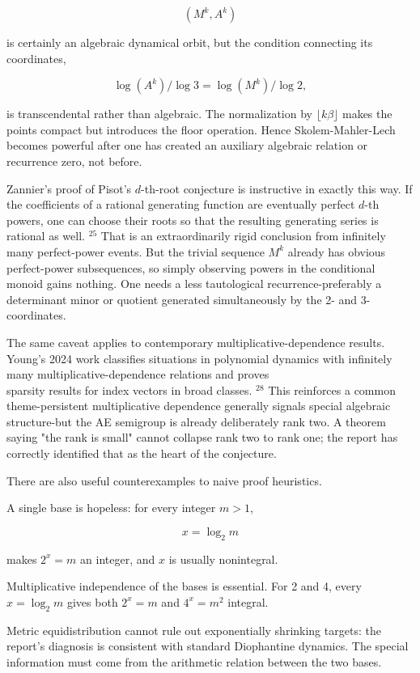 \documentclass[10pt]{article}
\begin{document}
$$
\left(M^{k}, A^{k}\right)
$$

is certainly an algebraic dynamical orbit, but the condition connecting its coordinates,

$$
\log \left(A^{k}\right) / \log 3=\log \left(M^{k}\right) / \log 2,
$$

is transcendental rather than algebraic. The normalization by $\lfloor k \beta\rfloor$ makes the points compact but introduces the floor operation. Hence Skolem-Mahler-Lech becomes powerful after one has created an auxiliary algebraic relation or recurrence zero, not before.

Zannier's proof of Pisot's $d$-th-root conjecture is instructive in exactly this way. If the coefficients of a rational generating function are eventually perfect $d$-th powers, one can choose their roots so that the resulting generating series is rational as well. ${ }^{25}$ That is an extraordinarily rigid conclusion from infinitely many perfect-power events. But the trivial sequence $M^{k}$ already has obvious perfect-power subsequences, so simply observing powers in the conditional monoid gains nothing. One needs a less tautological recurrence-preferably a determinant minor or quotient generated simultaneously by the 2- and 3-coordinates.

The same caveat applies to contemporary multiplicative-dependence results. Young's 2024 work classifies situations in polynomial dynamics with infinitely many multiplicative-dependence relations and proves\\
sparsity results for index vectors in broad classes. ${ }^{28}$ This reinforces a common theme-persistent multiplicative dependence generally signals special algebraic structure-but the AE semigroup is already deliberately rank two. A theorem saying "the rank is small" cannot collapse rank two to rank one; the report has correctly identified that as the heart of the conjecture.

There are also useful counterexamples to naive proof heuristics.

A single base is hopeless: for every integer $m>1$,

$$
x=\log _{2} m
$$

makes $2^{x}=m$ an integer, and $x$ is usually nonintegral.

Multiplicative independence of the bases is essential. For 2 and 4, every $x=\log _{2} m$ gives both $2^{x}=m$ and $4^{x}=m^{2}$ integral.

Metric equidistribution cannot rule out exponentially shrinking targets: the report's diagnosis is consistent with standard Diophantine dynamics. The special information must come from the arithmetic relation between the two bases.
\end{document}
